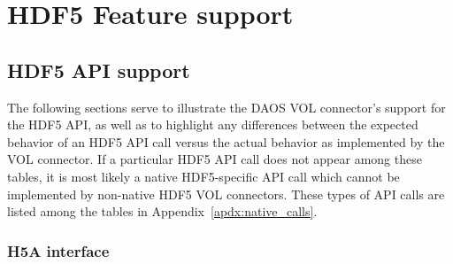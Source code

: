 \newpage

\section{HDF5 Feature support}

\subsection{HDF5 API support}

The following sections serve to illustrate the DAOS VOL connector's support for the HDF5 API, as well as to highlight any differences between the expected behavior of an HDF5 API call versus the actual behavior as implemented by the VOL connector. If a particular HDF5 API call does not appear among these tables, it is most likely a native HDF5-specific API call which cannot be implemented by non-native HDF5 VOL connectors. These types of API calls are listed among the tables in Appendix~\ref{apdx:native_calls}.

\newpage

\subsubsection{H5A interface}

